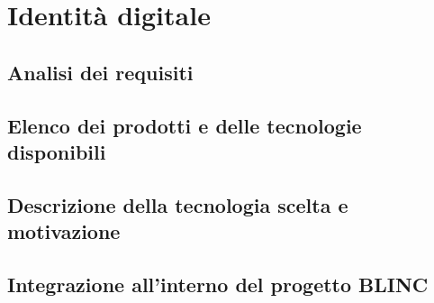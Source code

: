 \chapter{Identit\`a digitale}

\section{Analisi dei requisiti}

\section{Elenco dei prodotti e delle tecnologie disponibili}

\section{Descrizione della tecnologia scelta e motivazione}

\section{Integrazione all'interno del progetto BLINC}
